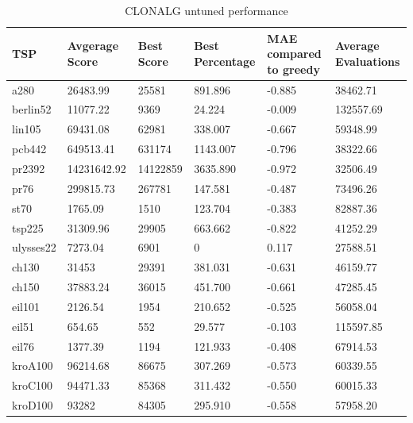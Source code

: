 \begin{table}[H]
	\begin{tabular}{|l|l|l|p{2cm}|p{2.5cm}|p{2cm}|}
		\hline
	TSP	& Avgerage Score & Best Score & Best Percentage &\textbf{ MAE compared to greedy} & Average Evaluations \\ \hline
		a280      & 26483.99       & 25581      & 891.896     & -0.885           & 38462.71            \\ \hline
		berlin52  & 11077.22       & 9369       & 24.224     & -0.009          & 132557.69           \\ \hline
		lin105    & 69431.08       & 62981      & 338.007     & -0.667           & 59348.99            \\ \hline
		pcb442    & 649513.41      & 631174     & 1143.007     & -0.796           & 38322.66            \\ \hline
		pr2392    & 14231642.92    & 14122859   & 3635.890     & -0.972           & 32506.49            \\ \hline
		pr76      & 299815.73      & 267781     & 147.581     & -0.487           & 73496.26            \\ \hline
		st70      & 1765.09        & 1510       & 123.704     & -0.383           & 82887.36            \\ \hline
		tsp225    & 31309.96       & 29905      & 663.662     & -0.822           & 41252.29            \\ \hline
		ulysses22 & 7273.04        & 6901       & 0               & 0.117            & 27588.51            \\ \hline
		ch130     & 31453          & 29391      & 381.031     & -0.631           & 46159.77            \\ \hline
		ch150     & 37883.24       & 36015      & 451.700     & -0.661           & 47285.45            \\ \hline
		eil101    & 2126.54        & 1954       & 210.652     & -0.525           & 56058.04            \\ \hline
		eil51     & 654.65         & 552        & 29.577     & -0.103           & 115597.85           \\ \hline
		eil76     & 1377.39        & 1194       & 121.933     & -0.408           & 67914.53            \\ \hline
		kroA100   & 96214.68       & 86675      & 307.269     & -0.573           & 60339.55            \\ \hline
		kroC100   & 94471.33       & 85368      & 311.432     & -0.550           & 60015.33            \\ \hline
		kroD100   & 93282          & 84305      & 295.910     & -0.558           & 57958.20            \\ \hline
	\end{tabular}
	\caption{CLONALG untuned performance}
	\label{tab:clonalg_untuned}
\end{table}
